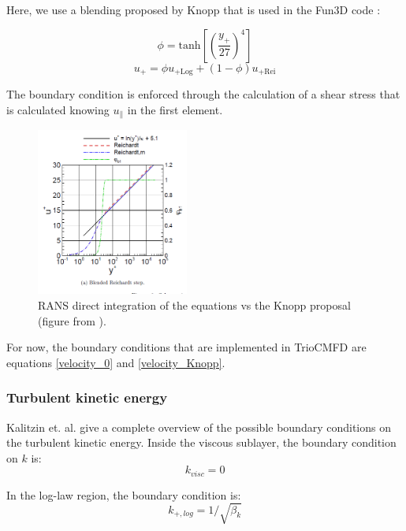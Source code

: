 Here, we use a blending proposed by Knopp  \cite{Knopp2007} that is used in the Fun3D code \cite{Fun3D2015}:

\begin{equation}
	\phi = \text{tanh}\left[\left(\frac{y_+}{27}\right)^4\right]
\end{equation}
\begin{equation}\label{velocity_Knopp}
	u_+ = \phi u_{+\text{Log}} +(1-\phi) u_{+\text{Rei}}
\end{equation}

The boundary condition is enforced through the calculation of a shear stress that is calculated knowing $u_{\parallel}$ in the first element.\\

\begin{figure}[h]
	\centering
	\includegraphics[width= 5cm]{Fun3D_v.png}
	\caption{RANS direct integration of the equations vs the Knopp proposal (figure from \cite{Knopp2007}).}
\end{figure}

For now, the boundary conditions that are implemented in TrioCMFD are equations \eqref{velocity_0} and \eqref{velocity_Knopp}.

\subsubsection{Turbulent kinetic energy}


Kalitzin et. al. \cite{Kalitzin2005} give a complete overview of the possible boundary conditions on the turbulent kinetic energy. Inside the viscous sublayer, the boundary condition on $k$ is:
\begin{equation}\label{eq_k_visc}
	k_{visc} = 0
\end{equation}

In the log-law region, the boundary condition is:
\begin{equation}\label{eq_k_log}
	k_{+,log} = 1/\sqrt{\beta_k}
\end{equation}


